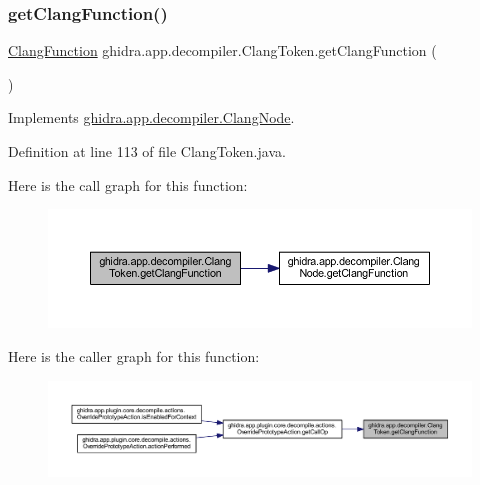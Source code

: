\subsubsection{\texorpdfstring{getClangFunction()}{getClangFunction()}}
{\footnotesize\ttfamily \mbox{\hyperlink{classghidra_1_1app_1_1decompiler_1_1_clang_function}{Clang\+Function}} ghidra.\+app.\+decompiler.\+Clang\+Token.\+get\+Clang\+Function (\begin{DoxyParamCaption}{ }\end{DoxyParamCaption})\hspace{0.3cm}{\ttfamily [inline]}}



Implements \mbox{\hyperlink{interfaceghidra_1_1app_1_1decompiler_1_1_clang_node_a715989d3fa33942a85517fae04a70ac0}{ghidra.\+app.\+decompiler.\+Clang\+Node}}.



Definition at line 113 of file Clang\+Token.\+java.

Here is the call graph for this function\+:
\nopagebreak
\begin{figure}[H]
\begin{center}
\leavevmode
\includegraphics[width=350pt]{classghidra_1_1app_1_1decompiler_1_1_clang_token_a786354033254b3425a2200a3141e7cfd_cgraph}
\end{center}
\end{figure}
Here is the caller graph for this function\+:
\nopagebreak
\begin{figure}[H]
\begin{center}
\leavevmode
\includegraphics[width=350pt]{classghidra_1_1app_1_1decompiler_1_1_clang_token_a786354033254b3425a2200a3141e7cfd_icgraph}
\end{center}
\end{figure}
\mbox{\label{classghidra_1_1app_1_1decompiler_1_1_clang_token_aacea75ea4da0a1ed20b8034c5805b8d4}} 
